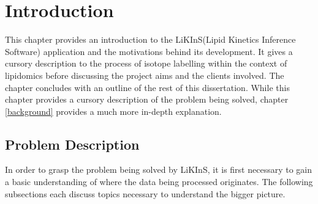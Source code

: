 \documentclass{l4proj}
\begin{document}
%
%
%
%
%
%
%
%
\chapter{Introduction}



This chapter provides an introduction to the LiKInS(Lipid Kinetics Inference Software) application and the motivations behind its development. It gives a cursory description to the process of isotope labelling within the context of lipidomics before discussing the project aims and the clients involved. The chapter concludes with an outline of the rest of this dissertation. While this chapter provides a cursory description of the problem being solved, chapter \ref{background} provides a much more in-depth explanation.

\section{Problem Description} \label{problem-description}
In order to grasp the problem being solved by LiKInS, it is first necessary to gain a basic understanding of where the data being processed originates. The following subsections each discuss topics necessary to understand the bigger picture. 
\end{document}
